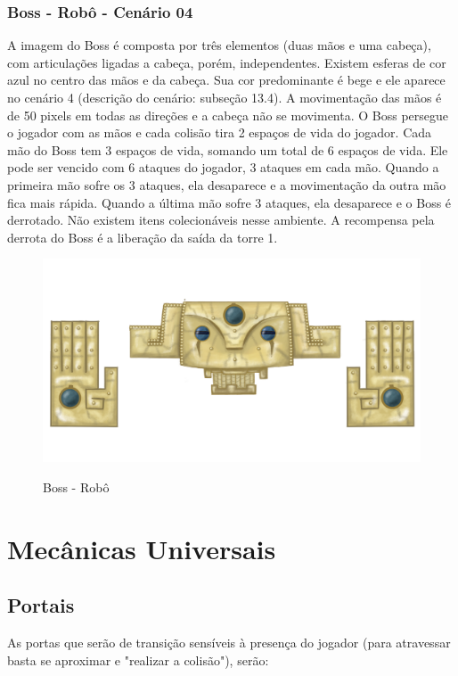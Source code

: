 \documentclass[12pt]{article}
\begin{document}
\subsubsection{Boss - Robô - Cenário 04}
A imagem do Boss é composta por três elementos (duas mãos e uma cabeça), com
articulações ligadas a cabeça, porém, independentes. Existem esferas de cor azul
no centro das mãos e da cabeça. Sua cor predominante é bege e ele aparece no
cenário 4 (descrição do cenário: subseção 13.4). A movimentação das mãos é de 50
pixels em todas as direções e a cabeça não se movimenta. O Boss persegue o
jogador com as mãos e cada colisão tira 2 espaços de vida do jogador. Cada mão
do Boss tem 3 espaços de vida, somando um total de 6 espaços de vida. Ele pode
ser vencido com 6 ataques do jogador, 3 ataques em cada mão. Quando a primeira
mão sofre os 3 ataques, ela desaparece e a movimentação da outra mão fica mais
rápida. Quando a última mão sofre 3 ataques, ela desaparece e o Boss é
derrotado.  Não existem itens colecionáveis nesse ambiente. A recompensa pela
derrota do Boss é a liberação da saída da torre 1.

\begin{figure}[!htb]
	\centering
    \includegraphics[scale=1]{boss_robo.png}
    \label{fig:boss_robo}
    \caption{Boss - Robô}
\end{figure}

\newpage

\section{Mecânicas Universais}

\subsection{Portais}
As portas que serão de transição sensíveis à presença do jogador (para atravessar
basta se aproximar e "realizar a colisão"), serão:
\end{document}
